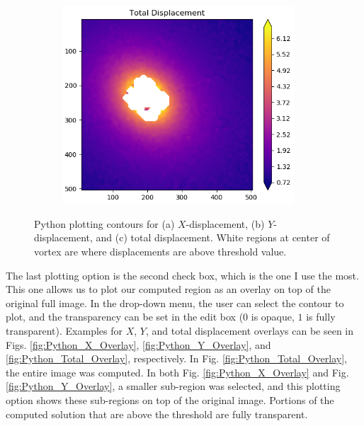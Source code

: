 \documentclass[letterpaper,12pt]{article}
\begin{document}
\begin{figure}[h]
\begin{subfigure}[b]{0.3\textwidth}
        \caption{}
        \label{fig:Python_Y_Displacement}
    \end{subfigure}
    \begin{subfigure}[b]{0.3\textwidth}
    	\centering
        \includegraphics[width=0.95\textwidth]{Python_Total_Displacement.PNG}
        \caption{}
        \label{fig:Python_Total_Displacement}
    \end{subfigure}
 	
    \caption{Python plotting contours for (a) $X$-displacement, (b) $Y$-displacement, and (c) total displacement.  White regions at center of vortex are where displacements are above threshold value.}
    \label{fig:Python_Displacement}
\end{figure}

The last plotting option is the second check box, which is the one I use the most.  This one allows us to plot our computed region as an overlay on top of the original full image.  In the drop-down menu, the user can select the contour to plot, and the transparency can be set in the edit box ($0$ is opaque, $1$ is fully transparent).  Examples for $X$, $Y$, and total displacement overlays can be seen in Figs. \ref{fig:Python_X_Overlay}, \ref{fig:Python_Y_Overlay}, and \ref{fig:Python_Total_Overlay}, respectively.  In Fig. \ref{fig:Python_Total_Overlay}, the entire image was computed.  In both Fig. \ref{fig:Python_X_Overlay} and Fig. \ref{fig:Python_Y_Overlay}, a smaller sub-region was selected, and this plotting option shows these sub-regions on top of the original image.  Portions of the computed solution that are above the threshold are fully transparent.
\end{document}
